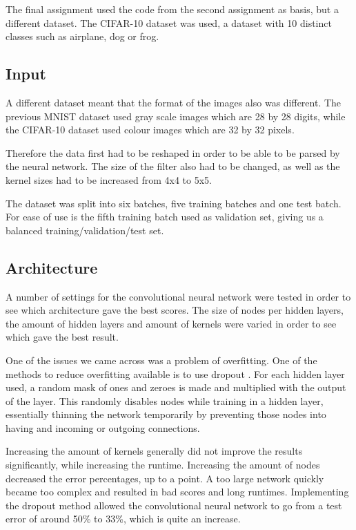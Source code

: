 
The final assignment used the code from the second assignment as basis, but a different dataset. The CIFAR-10 dataset was used, a dataset with 10 distinct classes such as airplane, dog or frog.

\subsection*{Input}
A different dataset meant that the format of the images also was different. The previous MNIST dataset used gray scale images which are 28 by 28 digits, while the CIFAR-10 dataset used colour images which are 32 by 32 pixels. 

Therefore the data first had to be reshaped in order to be able to be parsed by the neural network. The size of the filter also had to be changed, as well as the kernel sizes had to be increased from 4x4 to 5x5.

The dataset was split into six batches, five training batches and one test batch. For ease of use is the fifth training batch used as validation set, giving us a balanced training/validation/test set.

\subsection*{Architecture}
A number of settings for the convolutional neural network were tested in order to see which architecture gave the best scores. The size of nodes per hidden layers, the amount of hidden layers and amount of kernels were varied in order to see which gave the best result.

One of the issues we came across was a problem of overfitting. One of the methods to reduce overfitting available is to use dropout \cite{krizhevsky2012imagenet}\cite{srivastava2014dropout} .
 For each hidden layer used, a random mask of ones and zeroes is made and multiplied with the output of the layer. This randomly disables nodes while training in a hidden layer, essentially thinning the network temporarily by preventing those nodes into having and incoming or outgoing connections.

Increasing the amount of kernels generally did not improve the results significantly, while increasing the runtime. Increasing the amount of nodes decreased the error percentages, up to a point. A too large network quickly became too complex and resulted in bad scores and long runtimes. Implementing the dropout method allowed the convolutional neural network to go from a test error of around 50\% to 33\%, which is quite an increase.

